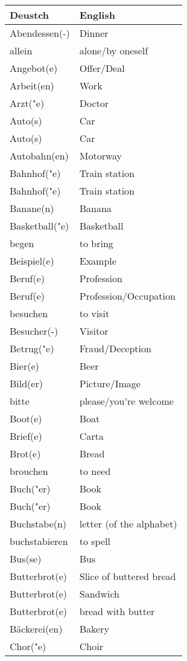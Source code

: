 \documentclass{article}
\renewcommand{\arraystretch}{1}
\begin{document}
\begin{minipage}{0.48\textwidth}
    \centering
    \renewcommand{\arraystretch}{1.5}
    \begin{tabular}{|>{\raggedright\arraybackslash}p{3.5cm}|>{\raggedright\arraybackslash}p{3.5cm}|}
        \hline
        \rowcolor{gray!20} \textbf{Deustch} & \textbf{English} \\
        \hline
        Abendessen(-) & Dinner \\\hline
        allein & alone/by oneself \\\hline
        Angebot(e) & Offer/Deal \\\hline
        Arbeit(en) & Work \\\hline
        Arzt("e) & Doctor \\\hline
        Auto(s) & Car \\\hline
        Auto(s) & Car \\\hline
        Autobahn(en) & Motorway \\\hline
        Bahnhof("e) & Train station \\\hline
        Bahnhof("e) & Train station \\\hline
        Banane(n) & Banana \\\hline
        Basketball("e) & Basketball \\\hline
        begen & to bring \\\hline
        Beispiel(e) & Example \\\hline
        Beruf(e) & Profession \\\hline
        Beruf(e) & Profession/Occupation \\\hline
        besuchen & to visit \\\hline
        Besucher(-) & Visitor \\\hline
        Betrug("e) & Fraud/Deception \\\hline
        Bier(e) & Beer \\\hline
        Bild(er) & Picture/Image \\\hline
        bitte & please/you're welcome \\\hline
        Boot(e) & Boat \\\hline
        Brief(e) & Carta \\\hline
        Brot(e) & Bread \\\hline
        brouchen & to need \\\hline
        Buch("er) & Book \\\hline
        Buch("er) & Book \\\hline
        Buchstabe(n) &  letter (of the alphabet) \\\hline
        buchstabieren & to spell \\\hline
        Bus(se) & Bus \\\hline
        Butterbrot(e) & Slice of buttered bread \\\hline
        Butterbrot(e) & Sandwich \\\hline
        Butterbrot(e) & bread with butter \\\hline
        Bäckerei(en) & Bakery \\\hline
        Chor("e) & Choir \\\hline
    \end{tabular}
\end{minipage}%
\end{document}

